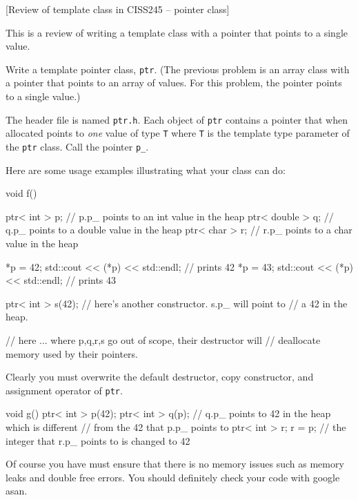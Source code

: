 [Review of template class in CISS245 -- pointer class]

This is a review of writing a template class with a pointer that points
to a single value.

Write a template pointer class, \verb!ptr!.
(The previous problem is an array class with a pointer that points to an
array of values. For this problem, the pointer points to a single value.)

The header file is named \verb!ptr.h!.
Each object of \verb!ptr! contains a pointer that when allocated points to
\textit{one} value of type \verb!T! where \verb!T! is the template
type parameter of the \verb!ptr! class.
Call the pointer \verb!p_!.

Here are some usage examples illustrating what your class can do:
\begin{console}[fontsize=\footnotesize]
void f()
{
    ptr< int > p;    // p.p_ points to an int value in the heap
    ptr< double > q; // q.p_ points to a double value in the heap
    ptr< char > r;   // r.p_ points to a char value in the heap
  
    *p = 42;
    std::cout << (*p) << std::endl; // prints 42
    *p = 43;
    std::cout << (*p) << std::endl; // prints 43

    ptr< int > s(42); // here's another constructor. s.p_ will point to
                      // a 42 in the heap.
    
    // here ... where p,q,r,s go out of scope, their destructor will
    // deallocate memory used by their pointers.
}
\end{console}
Clearly you must overwrite the default destructor, copy constructor,
and assignment operator of \verb!ptr!.
\begin{console}[fontsize=\footnotesize]
void g()
{
    ptr< int > p(42); 
    ptr< int > q(p);  // q.p_ points to 42 in the heap which is different
                      // from the 42 that p.p_ points to
    ptr< int > r;
    r = p;            // the integer that r.p_ points to is changed to 42
}
\end{console}

Of course you have must ensure that there is no memory issues such as
memory leaks and double free errors.
You should definitely check your code with google asan.


